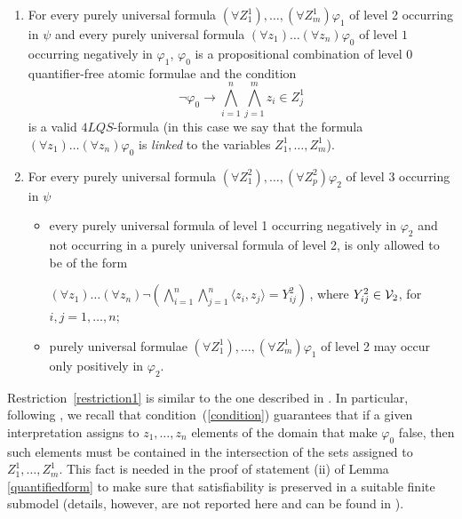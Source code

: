 \documentclass{fundam}
\newcommand{\QLQS}{\ensuremath{\mbox{$4\mathit{LQS}$}}\xspace}
\begin{document}
\begin{enumerate}[{Restr.} I.]
\item \label{restriction1} For every purely universal formula $(\forall Z_1^1),\ldots,(\forall
Z_m^1)\varphi_1$ of level 2 occurring in $\psi$ and every purely universal formula $(\forall z_1) \ldots (\forall z_n)
\varphi_0$ of level
$1$ occurring negatively in $\varphi_1$, $\varphi_0$ is a propositional combination of level 0 quantifier-free atomic formulae and the
condition
\begin{equation}
    \label{condition}
\neg \varphi_0 \rightarrow \bigwedge_{i=1}^n \bigwedge_{j=1}^m  z_i \in Z_j^1
\end{equation}
is a valid $\QLQS$-formula (in this case we say that the formula
$(\forall z_1) \ldots (\forall z_n) \varphi_0$ is {\em linked} to the
variables $Z_1^1, \ldots , Z_m^1$).
\item \label{restriction2} For
every purely universal formula $(\forall Z_1^2),\ldots,(\forall Z_p^2)\varphi_2$ of level 3 occurring in $\psi$
\begin{itemize}
\item every purely universal formula of level 1 occurring negatively
in $\varphi_2$ and not occurring in a purely universal formula of
level 2, is only allowed to be of the form

    $(\forall z_1)\ldots(\forall z_n)\neg(\bigwedge_{i=1}^n
    \bigwedge_{j=1}^n\langle z_i,z_j\rangle=Y_{ij}^2)\,$, where
    $Y_{ij}^2 \in {\cal V}_2$, for $i,j = 1,\ldots,n$;

    \item purely universal formulae $(\forall Z_1^1),\ldots,(\forall
    Z_m^1)\varphi_1$ of level 2 may occur only positively in
    $\varphi_2$.
\end{itemize}

\end{enumerate}
Restriction~\ref{restriction1} is similar to the one described in \cite{CanNic08}.
In particular, following \cite{CanNic08}, we recall that condition~(\ref{condition})
guarantees that if a given interpretation assigns to $z_1,\ldots,z_n$
elements of the domain that make $\varphi_0$ false, then such elements
must be contained in the intersection of the sets assigned to
$Z_1^1,\ldots,Z_m^1$.  This fact is needed in the proof of statement
(ii) of Lemma \ref{quantifiedform} to make sure that satisfiability is
preserved in a suitable finite submodel (details, however, are not
reported here and can be found in \cite{CanNic08}).
\end{document}
